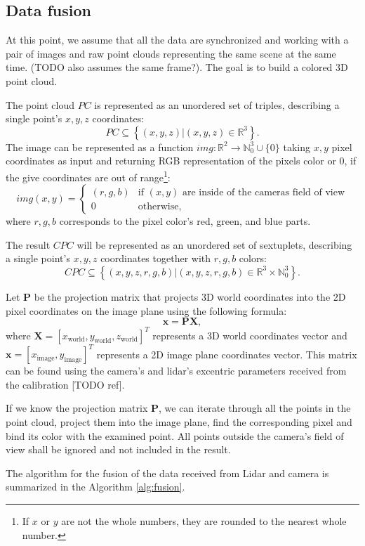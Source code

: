 \subsection{Data fusion}

At this point, we assume that all the data are synchronized and working with a pair of images and raw point clouds representing the same scene at the same time. (TODO also assumes the same frame?). The goal is to build a colored 3D point cloud.\par
The point cloud $PC$ is represented as an unordered set of triples, describing a single point's $x, y, z$ coordinates:
$$
    PC \subseteq \left\{ (x,y,z) | (x,y,z) \in \mathbb{R}^3\right\}.
$$
The image can be represented as a function $img: \mathbb{R}^2 \rightarrow \mathbb{N}_0^3 \cup \{0\}$ taking $x,y$ pixel coordinates as input and returning RGB representation of the pixels color or 0, if the give coordinates are out of range\footnote{If $x$ or $y$ are not the whole numbers, they are rounded to the nearest whole number.}:
$$
    img(x,y) = \begin{cases}
        (r,g,b) & \text{if $(x,y)$ are inside of the cameras field of view} \\
        0       & \text{otherwise,}
    \end{cases}
$$
where $r,g,b$ corresponds to the pixel color's red, green, and blue parts.\par
The result $CPC$ will be represented as an unordered set of sextuplets, describing a single point's $x, y, z$ coordinates together with $r, g, b$ colors:
$$
    CPC \subseteq \left\{ (x,y,z,r,g,b) | (x,y,z,r,g,b) \in \mathbb{R}^3 \times \mathbb{N}_0^3 \right\}.
$$\par
Let $\mathbf{P}$ be the projection matrix that projects 3D world coordinates into the 2D pixel coordinates on the image plane using the following formula:
$$
    \mathbf{x} = \mathbf{P}\mathbf{X},
$$
where $\mathbf{X} = \left[x_\text{world},y_\text{world},z_\text{world}\right]^T$ represents a 3D world coordinates vector and $\mathbf{x} = \left[x_\text{image}, y_\text{image}\right]^T$ represents a 2D image plane coordinates vector. This matrix can be found using the camera's and lidar's excentric parameters received from the calibration [TODO ref].\par
If we know the projection matrix $\mathbf{P}$, we can iterate through all the points in the point cloud, project them into the image plane, find the corresponding pixel and bind its color with the examined point. All points outside the camera's field of view shall be ignored and not included in the result.\par
The algorithm for the fusion of the data received from Lidar and camera is summarized in the Algorithm \ref{alg:fusion}.

